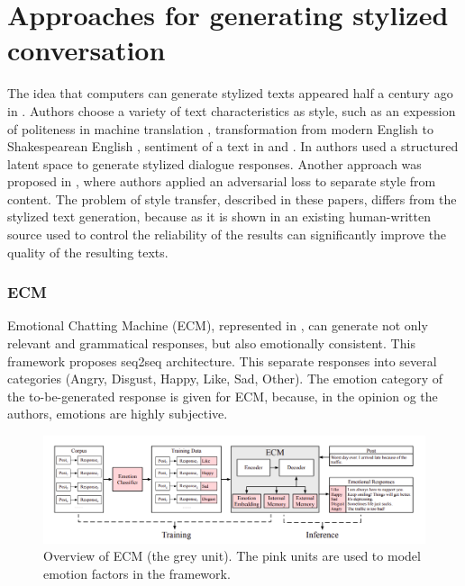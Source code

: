 \section{Approaches for generating stylized conversation} \label{stylized_problems}
The idea that computers can generate stylized texts appeared half a century ago in \cite{wheatley1965computer}. Authors choose a variety of text characteristics as style, such as an expession of politeness in machine translation \cite{sennrich2016controlling}, transformation from modern English to Shakespearean English \cite{jhamtani2017shakespearizing}, sentiment of a text in \cite{shen2017style} and \cite{li2018delete}. In \cite{gao2019structuring} authors used a structured latent space to generate stylized dialogue responses. Another approach was proposed in \cite{john2018disentangled}, where authors applied an adversarial loss to separate style from content. The problem of style transfer, described in these papers, differs from the stylized text generation, because as it is shown in \cite{guu2018generating} an existing human-written source used to control the reliability of the results can significantly improve the quality of the resulting texts. 

\subsubsection{ECM}
Emotional Chatting Machine (ECM), represented in \cite{zhou2018emotional}, can generate not only relevant and grammatical responses, but also emotionally consistent. This framework proposes seq2seq architecture. This separate responses into several categories (Angry, Disgust, Happy, Like, Sad, Other). The emotion category of the to-be-generated response is given for ECM, because, in the opinion og the authors, emotions are highly subjective. 

\begin{figure}[hbt]
  \centering
  \includegraphics[width=1\textwidth]{figures/ecm.png}
  \caption{ Overview of ECM (the grey unit). The pink units are used to model emotion factors in the framework.}
  \label{ecm}
\end{figure}

